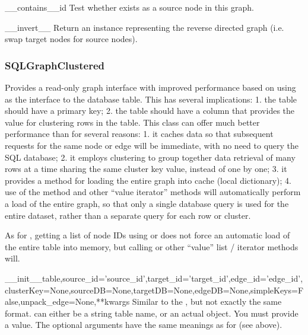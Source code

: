 \documentclass{howto}
\begin{document}
\begin{funcdesc}{__contains__}{id}
  Test whether  exists as a source node in this graph.
\end{funcdesc}

\begin{funcdesc}{__invert__}{}
  Return an  instance representing the reverse 
  directed graph (i.e. swap target nodes for source nodes).
\end{funcdesc}

\subsubsection{SQLGraphClustered}
Provides a read-only graph interface with improved performance based on
using  as the interface to the database
table.  This has several implications: 1. the table should have
a primary key; 2. the table should have a 
column that provides the value for clustering rows in the table.
This class can offer much better performance than 
for several reasons: 1. it caches data so that subsequent requests
for the same node or edge will be immediate, with no need to query
the SQL database; 2. it employs clustering to group together 
data retrieval of many rows at a time sharing the same cluster key
value, instead of one by one; 3. it provides a 
method for loading the entire graph into cache (local dictionary);
4. use of the  method and other ``value iterator'' methods
will automatically perform a load of the entire graph, so that 
only a single database query is used for the entire dataset, 
rather than a separate query for each row or cluster.

As for , getting a list of node IDs using
 or  does not force an automatic load of 
the entire table into memory, but calling  or
other ``value'' list / iterator methods will.

\begin{funcdesc}{__init__}{table,source_id='source_id',target_id='target_id',edge_id='edge_id',clusterKey=None,sourceDB=None,targetDB=None,edgeDB=None,simpleKeys=False,unpack_edge=None,**kwargs}
  Similar to the , but not exactly the same format.
   can either be a string table name, or an actual 
   object.  You must provide a 
  value.  The  optional
  arguments have the same meanings as for  (see above).
\end{funcdesc}
\end{document}
